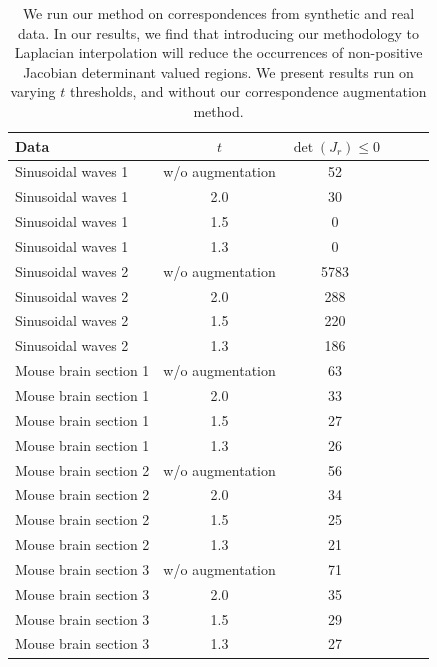 \documentclass[lettersize,journal]{IEEEtran}
\begin{document}
\begin{table}[ht]
    \caption{We run our method on correspondences from synthetic and real data. In our results, we find that introducing our methodology to Laplacian interpolation will reduce the occurrences of non-positive Jacobian determinant valued regions. We present results run on varying $t$ thresholds, and without our correspondence augmentation method.}
    \label{tab:results}
    \begin{tabular}{lccccc}
    \toprule
    Data & $t$ & $\det{(J_r)} \le 0$ \\
    \hline
    Sinusoidal waves 1 & w/o augmentation & 52 \\ %
    Sinusoidal waves 1 & 2.0 & 30 \\ %
    Sinusoidal waves 1 & 1.5 & 0 \\  %
    Sinusoidal waves 1 & 1.3 & 0 \\  %
    \hline
    Sinusoidal waves 2 & w/o augmentation & 5783 \\ %
    Sinusoidal waves 2 & 2.0 & 288 \\ %
    Sinusoidal waves 2 & 1.5 & 220 \\  %
    Sinusoidal waves 2 & 1.3 & 186 \\  %
    \hline
    Mouse brain section 1 & w/o augmentation & 63  \\ %
    Mouse brain section 1 & 2.0 & 33  \\ %
    Mouse brain section 1 & 1.5 & 27 \\  %
    Mouse brain section 1 & 1.3 & 26 \\  %
    \hline
    Mouse brain section 2 & w/o augmentation & 56  \\ %
    Mouse brain section 2 & 2.0 & 34  \\ %
    Mouse brain section 2 & 1.5 & 25 \\  %
    Mouse brain section 2 & 1.3 & 21 \\ %
    \hline
    Mouse brain section 3 & w/o augmentation & 71  \\ %
    Mouse brain section 3 & 2.0 & 35  \\ %
    Mouse brain section 3 & 1.5 & 29 \\ %
    Mouse brain section 3 & 1.3 & 27 \\ %
    \bottomrule
    \end{tabular}
\end{table}
\end{document}
